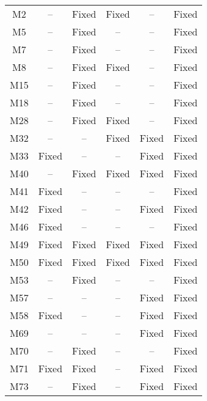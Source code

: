 \begin{table}[!t]
{\begin{tabular}{|c|c|c|c|c|c|}
\hline
M2                & --        & Fixed     & Fixed     & --        &Fixed   \\
M5                & --        & Fixed     & --        & --        &Fixed   \\
M7                & --        & Fixed     & --        & --        &Fixed   \\
M8                & --        & Fixed     & Fixed     & --        &Fixed   \\
M15               & --        & Fixed     & --        & --        &Fixed   \\
M18               & --        & Fixed     & --        & --        &Fixed   \\
M28               & --        & Fixed     & Fixed     & --        &Fixed   \\
M32               & --        & --        & Fixed     & Fixed     &Fixed   \\
M33               & Fixed     & --        & --        & Fixed     &Fixed   \\
M40               & --        & Fixed     & Fixed     & Fixed     &Fixed   \\
M41               & Fixed     & --        & --        & --        &Fixed   \\
M42               & Fixed     & --        & --        & Fixed     &Fixed   \\
M46               & Fixed     & --        & --        & --        &Fixed   \\
M49               & Fixed     & Fixed     & Fixed     & Fixed     &Fixed   \\
M50               & Fixed     & Fixed     & Fixed     & Fixed     &Fixed   \\
M53               & --        & Fixed     & --        & --        &Fixed   \\
M57               & --        & --        & --        & Fixed     &Fixed   \\
M58               & Fixed     & --        & --        & Fixed     &Fixed   \\
M69               & --        & --        & --        & Fixed     &Fixed   \\
M70               & --        & Fixed     & --        & --        &Fixed   \\
M71               & Fixed     & Fixed     & --        & Fixed     &Fixed   \\
M73               & --        & Fixed     & --        & Fixed     &Fixed   \\

\end{tabular}}
\end{table}
